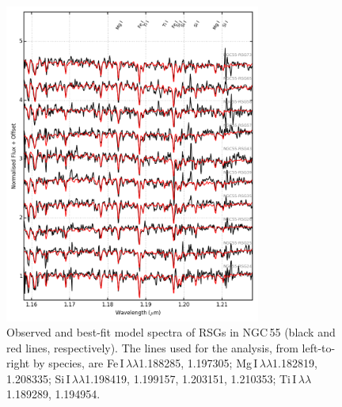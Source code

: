 \begin{figure}
 \begin{center}
 \centering
\includegraphics[width=0.75\textwidth]{ngc55/NGC55-model-fits}
\caption[Observed and best-fit model spectra of RSGs in NGC\,55]{Observed and best-fit model spectra of RSGs in NGC\,55 (black and red lines, respectively).
The lines used for the analysis, from left-to-right by species, are
Fe\,{\scriptsize I}$\,\lambda\lambda$1.188285,
1.197305;
Mg\,{\scriptsize I}$\,\lambda\lambda$1.182819,
1.208335;
Si\,{\scriptsize I}$\,\lambda\lambda$1.198419,
1.199157,
1.203151,
1.210353;
Ti\,{\scriptsize I}$\,\lambda\lambda$1.189289,
1.194954.\label{fig:ngc55spec}}
\end{center}
\end{figure}


